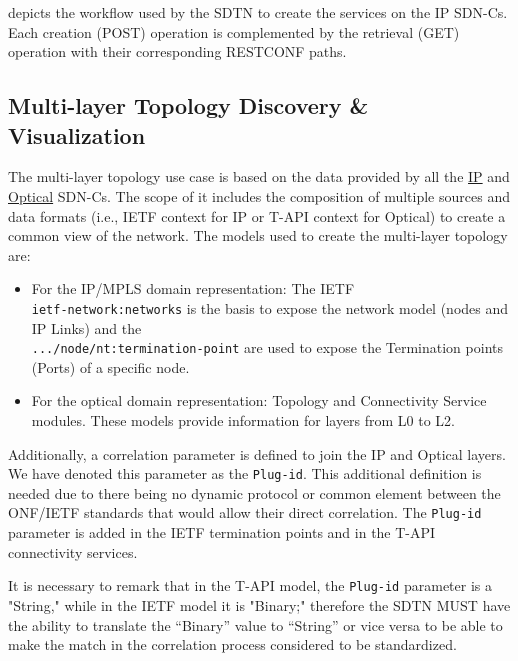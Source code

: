 \documentclass[a4paper,fleqn]{cas-dc}
\begin{document}
 depicts the workflow used by the SDTN to create the services on the IP SDN-Cs. Each creation (POST) operation is complemented by the retrieval (GET) operation with their corresponding RESTCONF paths. 


\subsection{Multi-layer Topology Discovery \& Visualization}

The multi-layer topology use case is based on the data provided by all the \hyperref[subsection:IPtopo]{IP} and \hyperref[subsection:OPTopo]{Optical} SDN-Cs. The scope of it includes the composition of multiple sources and data formats (i.e., IETF context for IP or T-API context for Optical) to create a common view of the network. The models used to create the multi-layer topology are:
\begin{itemize}
    \item For the IP/MPLS domain representation: The IETF\\ \texttt{ietf-network:networks} is the basis to expose the network model (nodes and IP Links) and the \\ \texttt{.../node/nt:termination-point} are used to expose the Termination points (Ports) of a specific node.
    \item For the optical domain representation: Topology and Connectivity Service modules. These models provide information for layers from L0 to L2.
\end{itemize}
    
Additionally, a correlation parameter is defined to join the IP and Optical layers. We have denoted this parameter as the \texttt{Plug-id}. This additional definition is needed due to there being no dynamic protocol or common element between the ONF/IETF standards that would allow their direct correlation. The \texttt{Plug-id} parameter is added in the IETF termination points and in the T-API connectivity services. 

It is necessary to remark that in the T-API model, the \texttt{Plug-id} parameter is a "String," while in the IETF model it is "Binary;" therefore the SDTN MUST have the ability to translate the “Binary” value to “String” or vice versa to be able to make the match in the correlation process considered to be standardized.
\end{document}

